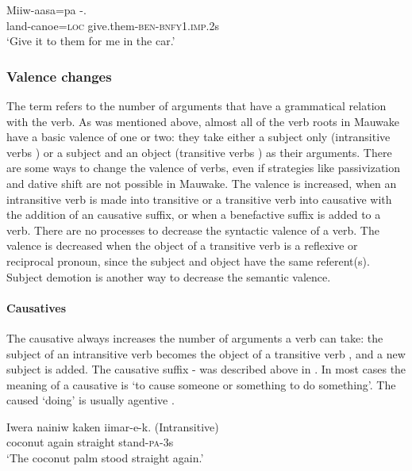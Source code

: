 \ea%
\label{ex:3:x338}
\gll Miiw-aasa=pa -. \\
land-canoe=\textsc{loc} give.them-\textsc{ben}-\textsc{bnfy}1.\textsc{imp}.2s \\
\glt`Give it to them for me in the car.'
\z

\subsubsection{Valence changes}\label{sec:3.8.4.3}
{}
The term  refers to the number of arguments that have a grammatical relation with the verb. As was mentioned above, almost all of the verb roots in Mauwake have a basic valence of one or two: they take either a subject only (intransitive verbs ) or a subject and an object (transitive verbs ) as their arguments. There are some ways to change the valence of verbs, even if strategies like passivization and dative shift are not possible in Mauwake. The valence is increased, when an intransitive verb is made into transitive or a transitive verb into causative with the addition of an causative suffix, or when a benefactive suffix is added to a verb. There are no processes to decrease the syntactic valence of a verb. The  valence is decreased when the object of a transitive verb is a reflexive or reciprocal pronoun, since the subject and object have the same referent(s). Subject demotion is another way to decrease the semantic valence. 

\paragraph{Causatives}\label{sec:3.8.4.3.1}
{}
The causative always increases the number of arguments a verb can take: the subject of an intransitive verb  becomes the object of a transitive verb , and a new subject is added. The causative suffix - was described above in . In most cases the meaning of a causative is `to cause someone or something to do something'. The caused `doing' is usually agentive . 

\ea%
\label{ex:3:x997}
\gll Iwera nainiw kaken iimar-e-k. (Intransitive) \\
coconut again straight stand-\textsc{pa}-3s\\
\glt`The coconut palm stood straight again.'
\z

